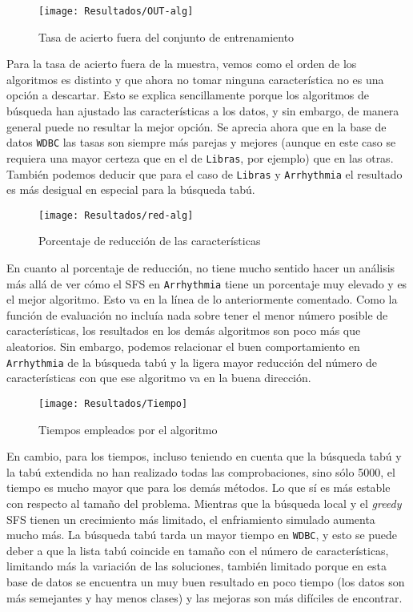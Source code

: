\documentclass[11pt,leqno]{article}
\begin{document}
\begin{figure}[h!]
\centering
\texttt{[image: Resultados/OUT-alg]}
\caption{Tasa de acierto fuera del conjunto de entrenamiento}
\end{figure}

Para la tasa de acierto fuera de la muestra, vemos como el orden de los algoritmos es distinto y que ahora no tomar ninguna característica no es una opción a descartar. Esto se explica sencillamente porque los algoritmos de búsqueda han ajustado las características a los datos, y sin embargo, de manera general puede no resultar la mejor opción. Se aprecia ahora que en la base de datos \texttt{WDBC} las tasas son siempre más parejas y mejores (aunque en este caso se requiera una mayor certeza que en el de \texttt{Libras}, por ejemplo) que en las otras. También podemos deducir que para el caso de \texttt{Libras} y \texttt{Arrhythmia} el resultado es más desigual en especial para la búsqueda tabú.

\begin{figure}[h!]
\centering
\texttt{[image: Resultados/red-alg]}
\caption{Porcentaje de reducción de las características}
\end{figure}

En cuanto al porcentaje de reducción, no tiene mucho sentido hacer un análisis más allá de ver cómo el SFS en \texttt{Arrhythmia} tiene un porcentaje muy elevado y es el mejor algoritmo. Esto va en la línea de lo anteriormente comentado. Como la función de evaluación no incluía nada sobre tener el menor número posible de características, los resultados en los demás algoritmos son poco más que aleatorios. Sin embargo, podemos relacionar el buen comportamiento en \texttt{Arrhythmia} de la búsqueda tabú y la ligera mayor reducción del número de características con que ese algoritmo va en la buena dirección.

\begin{figure}[h!]
\centering
\texttt{[image: Resultados/Tiempo]}
\caption{Tiempos empleados por el algoritmo}
\end{figure}

En cambio, para los tiempos, incluso teniendo en cuenta que la búsqueda tabú y la tabú extendida no han realizado todas las comprobaciones, sino sólo 5000, el tiempo es mucho mayor que para los demás métodos. Lo que sí es más estable con respecto al tamaño del problema. Mientras que la búsqueda local y el \textit{greedy} SFS tienen un crecimiento más limitado, el enfriamiento simulado aumenta mucho más. La búsqueda tabú tarda un mayor tiempo en \texttt{WDBC}, y esto se puede deber a que la lista tabú coincide en tamaño con el número de características, limitando más la variación de las soluciones, también limitado porque en esta base de datos se encuentra un muy buen resultado en poco tiempo (los datos son más semejantes y hay menos clases) y las mejoras son más difíciles de encontrar.
\end{document}
